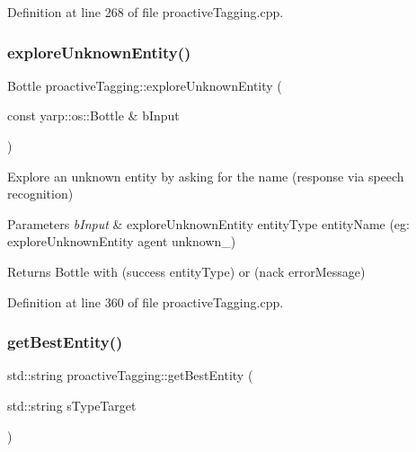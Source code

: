 Definition at line 268 of file proactive\+Tagging.\+cpp.

\mbox{\label{classproactiveTagging_a7645a181289f171fc5268ecd24e7ace9}} 
\subsubsection{\texorpdfstring{explore\+Unknown\+Entity()}{exploreUnknownEntity()}}
{\footnotesize\ttfamily Bottle proactive\+Tagging\+::explore\+Unknown\+Entity (\begin{DoxyParamCaption}\item[{const yarp\+::os\+::\+Bottle \&}]{b\+Input }\end{DoxyParamCaption})}



Explore an unknown entity by asking for the name (response via speech recognition) 


\begin{DoxyParams}{Parameters}
{\em b\+Input} & explore\+Unknown\+Entity entity\+Type entity\+Name (eg\+: explore\+Unknown\+Entity agent unknown\+\_) \\
\hline
\end{DoxyParams}
\begin{DoxyReturn}{Returns}
Bottle with (success entity\+Type) or (nack error\+Message) 
\end{DoxyReturn}


Definition at line 360 of file proactive\+Tagging.\+cpp.

\mbox{\label{classproactiveTagging_a203d678d3eb79a1fe78d9f2142e0459e}} 
\subsubsection{\texorpdfstring{get\+Best\+Entity()}{getBestEntity()}}
{\footnotesize\ttfamily std\+::string proactive\+Tagging\+::get\+Best\+Entity (\begin{DoxyParamCaption}\item[{std\+::string}]{s\+Type\+Target }\end{DoxyParamCaption})}



